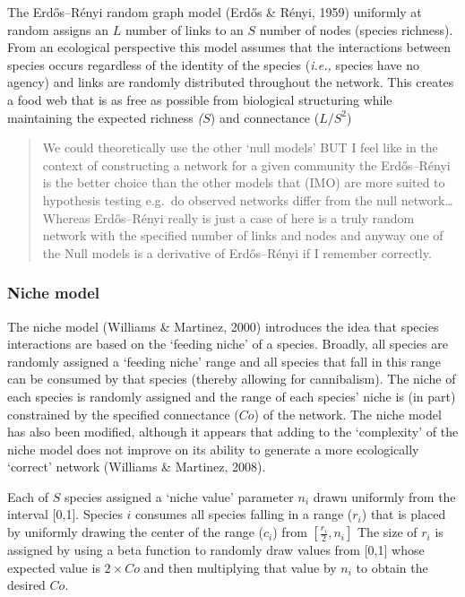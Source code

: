 \documentclass[
]{article}
\begin{document}
The Erdős--Rényi random graph model (Erdős \& Rényi, 1959) uniformly at
random assigns an \(L\) number of links to an \(S\) number of nodes
(species richness). From an ecological perspective this model assumes
that the interactions between species occurs regardless of the identity
of the species (\emph{i.e.,} species have no agency) and links are
randomly distributed throughout the network. This creates a food web
that is as free as possible from biological structuring while
maintaining the expected richness \emph{(}\(S\)) and connectance
(\(L/S^2\))

\begin{quote}
We could theoretically use the other `null models' BUT I feel like in
the context of constructing a network for a given community the
Erdős--Rényi is the better choice than the other models that (IMO) are
more suited to hypothesis testing e.g.~do observed networks differ from
the null network\ldots{} Whereas Erdős--Rényi really is just a case of
here is a truly random network with the specified number of links and
nodes and anyway one of the Null models is a derivative of Erdős--Rényi
if I remember correctly.
\end{quote}

\subsubsection{Niche model}\label{niche-model}

The niche model (Williams \& Martinez, 2000) introduces the idea that
species interactions are based on the `feeding niche' of a species.
Broadly, all species are randomly assigned a `feeding niche' range and
all species that fall in this range can be consumed by that species
(thereby allowing for cannibalism). The niche of each species is
randomly assigned and the range of each species' niche is (in part)
constrained by the specified connectance (\(Co\)) of the network. The
niche model has also been modified, although it appears that adding to
the `complexity' of the niche model does not improve on its ability to
generate a more ecologically `correct' network (Williams \& Martinez,
2008).

Each of \(S\) species assigned a `niche value' parameter \(n_i\) drawn
uniformly from the interval {[}0,1{]}. Species \(i\) consumes all
species falling in a range (\(r_i\)) that is placed by uniformly drawing
the center of the range (\(c_i\)) from \([ \frac{r_i}{2}, n_i ]\) The
size of \(r_i\) is assigned by using a beta function to randomly draw
values from {[}0,1{]} whose expected value is \(2 \times Co\) and then
multiplying that value by \(n_i\) to obtain the desired \(Co\).
\end{document}
